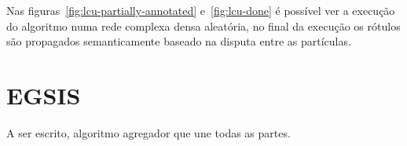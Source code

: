 \begin{figure}[!h]
        \captionsetup{width=12cm}
		\centering
\end{figure}
\FloatBarrier{}

Nas figuras~\ref{fig:lcu-partially-annotated} e~\ref{fig:lcu-done} é
possível ver a execução do algoritmo numa rede complexa densa
aleatória, no final da execução os rótulos são propagados
semanticamente baseado na disputa entre as partículas.


\section{EGSIS}\label{sec:teorica-egsis}

A ser escrito, algoritmo agregador que une todas as partes.
